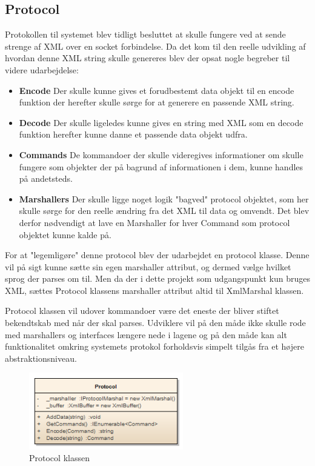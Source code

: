 \subsection{Protocol}\label{PROTOKOL}
Protokollen til systemet blev tidligt besluttet at skulle fungere ved at sende strenge af XML over en socket forbindelse. Da det kom til den reelle udvikling af hvordan denne XML string skulle genereres blev der opsat nogle begreber til videre udarbejdelse:

\begin{itemize}
\item \textbf{Encode} Der skulle kunne gives et forudbestemt data objekt til en encode funktion der herefter skulle sørge for at generere en passende XML string. 
\item \textbf{Decode} Der skulle ligeledes kunne gives en string med XML som en decode funktion herefter kunne danne et passende data objekt udfra. 
\item \textbf{Commands} De kommandoer der skulle videregives informationer om skulle fungere som objekter der på bagrund af informationen i dem, kunne handles på andetsteds.
\item \textbf{Marshallers} Der skulle ligge noget logik "bagved" protocol objektet, som her skulle sørge for den reelle ændring fra det XML til data og omvendt. Det blev derfor nødvendigt at lave en Marshaller for hver Command som protocol objektet kunne kalde på.
\end{itemize}

For at "legemligøre" denne protocol blev der udarbejdet en protocol klasse. Denne vil på sigt kunne sætte sin egen marshaller attribut, og dermed vælge hvilket sprog der parses om til. Men da der i dette projekt som udgangspunkt kun bruges XML, sættes Protocol klassens marshaller attribut altid til XmlMarshal klassen.

Protocol klassen vil udover kommandoer være det eneste der bliver stiftet bekendtskab med når der skal parses. Udviklere vil på den måde ikke skulle rode med marshallers og interfaces længere nede i lagene og på den måde kan alt funktionalitet omkring systemets protokol forholdsvis simpelt tilgås fra et højere abstraktionsniveau.

\begin{figure}[H]
	\centering
	\includegraphics[width=0.6\textwidth]{Systemdesign/SharedLib/Images/Klasser/Protocol.png}
	\caption{Protocol klassen}
	\label{fig:klasseProtocol}
\end{figure}


